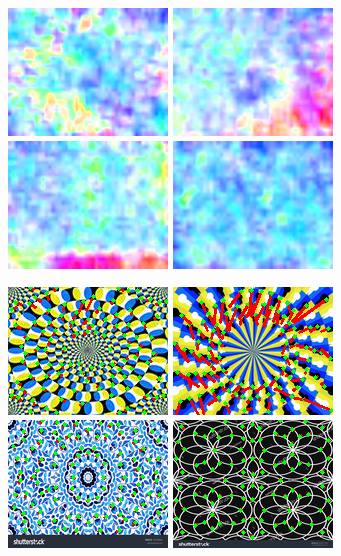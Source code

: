 \documentclass[journal]{IEEEtran}
\begin{document}
\begin{figure}
    \includegraphics[width=0.24\linewidth]{fig/rotate-0-flo.png}
    \includegraphics[width=0.24\linewidth]{fig/rotate-1-flo.png}
    \includegraphics[width=0.24\linewidth]{fig/control-0-flo.png}
    \includegraphics[width=0.24\linewidth]{fig/control-1-flo.png}
  
    \includegraphics[width=0.24\linewidth]{fig/lk-rotate-0.png}
    \includegraphics[width=0.24\linewidth]{fig/lk-rotate-1.png}
    \includegraphics[width=0.24\linewidth]{fig/lk-control-0.png}
    \includegraphics[width=0.24\linewidth]{fig/lk-control-1.png}
  

\end{figure}
\end{document}
